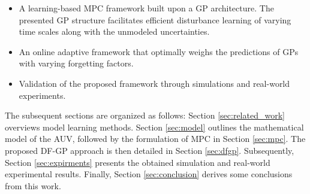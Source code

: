 
\begin{itemize}
  \item A learning-based \ac{MPC} framework built upon a \ac{GP} architecture. The presented GP structure facilitates efficient disturbance learning of varying time scales along with the unmodeled uncertainties.
     \item An online adaptive framework that optimally weighs the predictions of \ac{GP}s with varying forgetting factors.    
    \item Validation of the proposed framework through simulations and real-world experiments.
\end{itemize}

The subsequent sections are organized as follows:  Section \ref{sec:related_work} overviews model learning methods. Section \ref{sec:model} outlines the mathematical model of the AUV, followed by the formulation of \ac{MPC} in Section \ref{sec:mpc}. The proposed \ac{DF-GP} approach is then detailed in Section \ref{sec:dfgp}. Subsequently, Section \ref{sec:expirments} presents the obtained simulation and real-world experimental results. Finally, Section \ref{sec:conclusion} derives some conclusions from this work.

